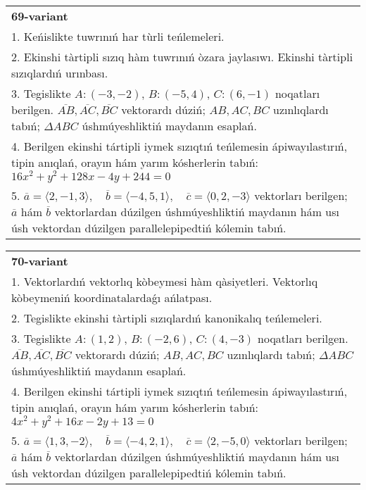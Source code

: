 \documentclass{article}
\begin{document}
\begin{tabular}{m{17cm}}
\textbf{69-variant}\\
1. Keńislikte tuwrınıń har tùrli teńlemeleri. \\

2. Ekinshi tàrtipli sızıq hàm tuwrınıń òzara jaylasıwı. Ekinshi tàrtipli sızıqlardıń urınbası.\\

3. Tegislikte $A: (-3, -2)$, $B: (-5, 4)$, $C: (6, -1)$ noqatları berilgen. $\overline{AB}, \overline{AC}, \overline{BC}$ vektorardı dúziń; $AB, AC, BC$ uzınlıqlardı tabıń; $\Delta ABC$ úshmúyeshliktiń maydanın esaplań. \\

4. Berilgen ekinshi tártipli iymek sızıqtıń teńlemesin ápiwayılastırıń, tipin anıqlań, orayın hám yarım kósherlerin tabıń: $16x^2+y^2+128x-4y+244=0$\\

5. \(\overline{a} = \langle 2, -1, 3 \rangle, \quad \overline{b} = \langle -4, 5, 1 \rangle, \quad \overline{c} = \langle 0, 2, -3 \rangle\) vektorları berilgen; \(\overline{a}\) hám \(\overline{b}\) vektorlardan dúzilgen úshmúyeshliktiń maydanın hám usı úsh vektordan dúzilgen parallelepipedtiń kólemin tabıń.
\end{tabular}
\vspace{1cm}


\begin{tabular}{m{17cm}}
\textbf{70-variant}\\
1. Vektorlardıń vektorlıq kòbeymesi hàm qàsiyetleri. Vektorlıq kòbeymeniń koordinatalardaǵı ańlatpası. \\

2. Tegislikte ekinshi tàrtipli sızıqlardıń kanonikalıq teńlemeleri.\\

3. Tegislikte $A: (1, 2)$, $B: (-2, 6)$, $C: (4, -3)$ noqatları berilgen. $\overline{AB}, \overline{AC}, \overline{BC}$ vektorardı dúziń; $AB, AC, BC$ uzınlıqlardı tabıń; $\Delta ABC$ úshmúyeshliktiń maydanın esaplań. \\

4. Berilgen ekinshi tártipli iymek sızıqtıń teńlemesin ápiwayılastırıń, tipin anıqlań, orayın hám yarım kósherlerin tabıń: $4x^2+y^2+16x-2y+13=0$\\

5. \(\overline{a} = \langle 1, 3, -2 \rangle, \quad \overline{b} = \langle -4, 2, 1 \rangle, \quad \overline{c} = \langle 2, -5, 0 \rangle\) vektorları berilgen; \(\overline{a}\) hám \(\overline{b}\) vektorlardan dúzilgen úshmúyeshliktiń maydanın hám usı úsh vektordan dúzilgen parallelepipedtiń kólemin tabıń.
\end{tabular}
\vspace{1cm}
\end{document}
